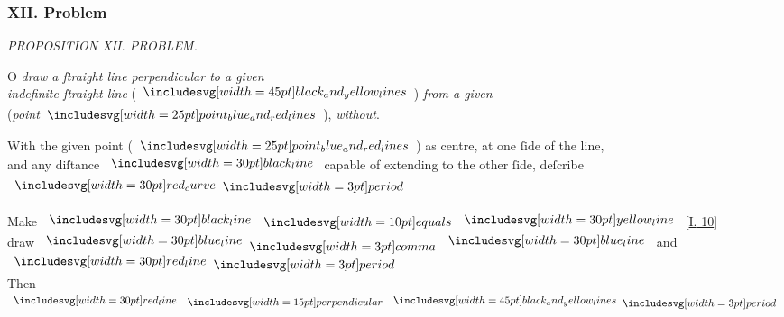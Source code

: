 \documentclass[12pt,preview]{standalone}
\begin{document}
\subsubsection{XII. Problem}

\begin{minipage}[t]{0.33\textwidth}
    \vspace{40pt}
    
\end{minipage}%
\hfill
\begin{minipage}[t]{0.64\textwidth}
    \vspace{0pt}

    \begin{center}
        \textit{PROPOSITION XII. PROBLEM.}\label{book1pr12} \\
    \end{center}

    \hfill

    \begin{center}
        \raggedright \lettrine[lines=4, loversize=1, nindent=0pt]{}{}O \textit{draw a ſtraight line perpendicular to a given\\ indefinite ſtraight line} (\hspace{-1ex}$\bimg{black_and_yellow_lines}$\hspace{-1ex}) \textit{from a given}\\ (\textit{point}$\img{point_blue_and_red_lines}$\hspace{-1ex}), \textit{without}.
    \end{center}

    \hfill

    \hfill

    \begin{center}
        With the given point (\hspace{-1ex}$\img{point_blue_and_red_lines}$\hspace{-1ex}) as centre, at one ſide of the line,\\
        and any diſtance $\blackline$ capable of extending to the other ſide, deſcribe $\img[0][0][30]{red_curve} \bperiod$\\
        \hfill\\
        Make $\blackline \bequals \yellowline$ [\hyperref[book1pr10]{\textsc{I.} 10}]\\
        draw $\blueline \bcomma \blueline$ and $\redline \bperiod$\\
        Then $\redline \bperp \bimg{black_and_yellow_lines} \bperiod$
    \end{center}


\end{minipage}
\end{document}
